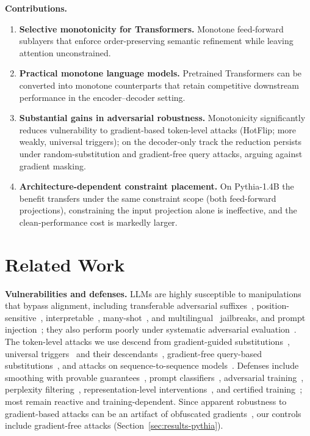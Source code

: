 \documentclass{article}
\theoremstyle{plain}
\theoremstyle{definition}
\theoremstyle{remark}
\theoremstyle{plain}
\begin{document}
\noindent\textbf{Contributions.}
\vspace{-0.5em}
\begin{enumerate}[leftmargin=*,itemsep=0pt,topsep=2pt]
    \item \textbf{Selective monotonicity for Transformers.} Monotone feed-forward sublayers that enforce order-preserving semantic refinement while leaving attention unconstrained.
    \item \textbf{Practical monotone language models.} Pretrained Transformers can be converted into monotone counterparts that retain competitive downstream performance in the encoder--decoder setting.
    \item \textbf{Substantial gains in adversarial robustness.} Monotonicity significantly reduces vulnerability to gradient-based token-level attacks (HotFlip; more weakly, universal triggers); on the decoder-only track the reduction persists under random-substitution and gradient-free query attacks, arguing against gradient masking.
    \item \textbf{Architecture-dependent constraint placement.} On Pythia-1.4B the benefit transfers under the same constraint scope (both feed-forward projections), constraining the input projection alone is ineffective, and the clean-performance cost is markedly larger.
\end{enumerate}

\section{Related Work}
\label{sec:related}
\textbf{Vulnerabilities and defenses.}
LLMs are highly susceptible to manipulations that bypass alignment, including transferable adversarial suffixes~\citep{Zou2023UniversalTransferableAttacksOnAlignedLLMs}, position-sensitive~\citep{wang2025vulnerability}, interpretable~\citep{Zhu2023AutoDAN}, many-shot~\citep{anil2024many}, and multilingual~\citep{deng2024multilingual} jailbreaks, and prompt injection~\citep{li2025security}; they also perform poorly under systematic adversarial evaluation~\citep{Wang2021AdvGLUE}. The token-level attacks we use descend from gradient-guided substitutions~\citep{ebrahimi2018hotflip}, universal triggers~\citep{wallace2019universal} and their descendants~\citep{shin2020autoprompt,guo2021gradient}, gradient-free query-based substitutions~\citep{jin2020bert}, and attacks on sequence-to-sequence models~\citep{cheng2020seq2sick}. Defenses include smoothing with provable guarantees~\citep{Robey2023SmoothLLM}, prompt classifiers~\citep{sayeedi2025jailbreaktracer}, adversarial training~\citep{howe2024effects}, perplexity filtering~\citep{jain2023baseline}, representation-level interventions~\citep{zou2024circuit}, and certified training~\citep{jia2019certified}; most remain reactive and training-dependent. Since apparent robustness to gradient-based attacks can be an artifact of obfuscated gradients~\citep{athalye2018obfuscated,carlini2019evaluating,tramer2020adaptive}, our controls include gradient-free attacks (Section~\ref{sec:results-pythia}).
\end{document}
